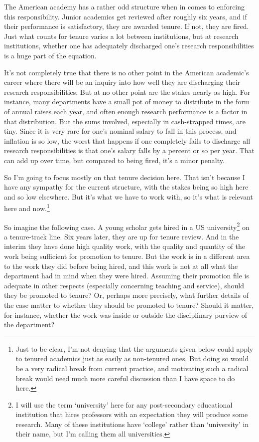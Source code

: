 The American academy has a rather odd structure when in comes to enforcing this responsibility. Junior academics get reviewed after roughly six years, and if their performance is satisfactory, they are awarded tenure. If not, they are fired. Just what counts for tenure varies a lot between institutions, but at research institutions, whether one has adequately discharged one's research responsibilities is a huge part of the equation.

It's not completely true that there is no other point in the American academic's career where there will be an inquiry into how well they are discharging their research responsibilities. But at no other point are the stakes nearly as high. For instance, many departments have a small pot of money to distribute in the form of annual raises each year, and often enough research performance is a factor in that distribution. But the sums involved, especially in cash-strapped times, are tiny. Since it is very rare for one's nominal salary to fall in this process, and inflation is so low, the worst that happens if one completely fails to discharge all research responsibilities is that one's salary falls by a percent or so per year. That can add up over time, but compared to being fired, it's a minor penalty.

So I'm going to focus mostly on that tenure decision here. That isn't because I have any sympathy for the current structure, with the stakes being so high here and so low elsewhere. But it's what we have to work with, so it's what is relevant here and now.\footnote{Just to be clear, I'm not denying that the arguments given below could apply to tenured academics just as easily as non-tenured ones. But doing so would be a very radical break from current practice, and motivating such a radical break would need much more careful discussion than I have space to do here.}

So imagine the following case. A young scholar gets hired in a US university\footnote{I will use the term `university' here for any post-secondary educational institution that hires professors with an expectation they will produce some research. Many of these institutions have `college' rather than `university' in their name, but I'm calling them all universities.} on a tenure-track line. Six years later, they are up for tenure review. And in the interim they have done high quality work, with the quality and quantity of the work being sufficient for promotion to tenure. But the work is in a different area to the work they did before being hired, and this work is not at all what the department had in mind when they were hired. Assuming their promotion file is adequate in other respects (especially concerning teaching and service), should they be promoted to tenure? Or, perhaps more precisely, what further details of the case matter to whether they should be promoted to tenure? Should it matter, for instance, whether the work was inside or outside the disciplinary purview of the department?

